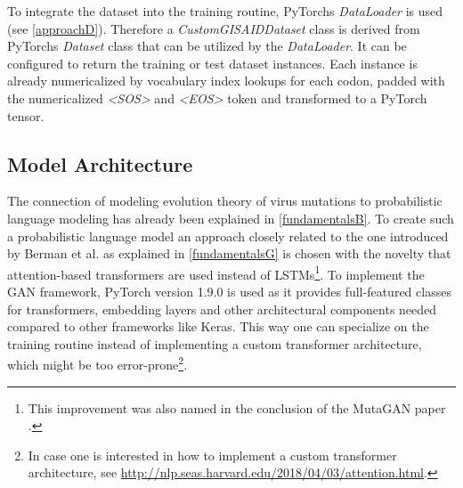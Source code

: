 To integrate the dataset into the training routine, PyTorchs \textit{DataLoader} is used (see \autoref{approachD}). Therefore a \textit{CustomGISAIDDataset} class is derived from PyTorchs \textit{Dataset} class that can be utilized by the \textit{DataLoader}. It can be configured to return the training or test dataset instances. Each instance is already numericalized by vocabulary index lookups for each codon, padded with the numericalized \textit{<SOS>} and \textit{<EOS>} token and transformed to a PyTorch tensor. 

\subsection{Model Architecture} \label{approachC}

The connection of modeling evolution theory of virus mutations to pro\-ba\-bi\-lis\-tic language modeling has already been explained in \autoref{fundamentalsB}. To create such a pro\-ba\-bi\-lis\-tic language model an approach closely related to the one introduced by Berman et al. \cite{Berman2020} as explained in \autoref{fundamentalsG} is chosen with the novelty that attention-based transformers are used instead of \acp{LSTM}\footnote{This improvement was also named in the conclusion of the MutaGAN paper \cite{Berman2020}.}. To implement the \ac{GAN} framework, PyTorch version 1.9.0 is used as it provides full-featured classes for transformers, embedding layers and other architectural components needed compared to other frameworks like Keras. This way one can specialize on the training routine instead of implementing a custom transformer architecture, which might be too error-prone\footnote{In case one is interested in how to implement a custom transformer architecture, see \url{http://nlp.seas.harvard.edu/2018/04/03/attention.html}.}. 

